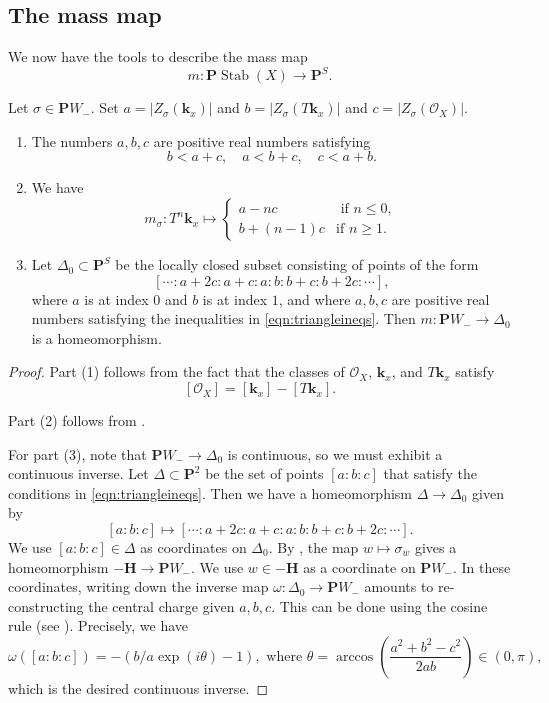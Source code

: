 \documentclass{amsart}
\begin{document}
\subsection{The mass map}
We now have the tools to describe the mass map
\[ m \colon \mathbf{P} \operatorname{Stab}(X) \to \mathbf{P}^S.\]
\begin{proposition}\label{prop:triangle0}
  Let \(\sigma \in \mathbf{P} W_{-}\).
  Set \(a = |Z_{\sigma}(\mathbf{k}_x)|\) and \(b = |Z_{\sigma}(T \mathbf{k}_{x})|\) and \(c = |Z_{\sigma}(\mathcal{O}_X)|\).
  \begin{enumerate}
  \item \label{eqn:triangleineqs}   The numbers \(a, b, c\) are positive real numbers satisfying
   \[
    b < a + c, \quad a < b+c, \quad c < a + b.
   \]
  \item We have
  \[ m_{\sigma} \colon T^n \mathbf{k}_x \mapsto
    \begin{cases}
      a - n c &\text{ if } n \leq 0,\\
      b + (n-1) c & \text{if } n \geq 1.
    \end{cases}
  \]
  \item Let \(\Delta_{0} \subset \mathbf{P}^S\) be the locally closed subset consisting of points of the form
   \[ [\cdots :a+2c:a+c:a:b:b+c:b+2c: \cdots],\]
   where \(a\) is at index 0 and \(b\) is at index \(1\), and where \(a,b,c\) are positive real numbers satisfying the inequalities in \eqref{eqn:triangleineqs}.
   Then \(m \colon \mathbf{P}W_{-} \to \Delta_{0}\) is a homeomorphism.
 \end{enumerate}
\end{proposition}
\begin{proof}
  Part (1) follows from the fact that the classes of \(\mathcal{O}_X\), \(\mathbf{k}_x\), and \(T \mathbf{k}_x\) satisfy
  \[ [\mathcal{O}_X] = [\mathbf{k}_x] - [T \mathbf{k}_x].\]

  Part (2) follows from .

  For part (3), note that \(\mathbf{P}W_- \to \Delta_0\) is continuous, so we must exhibit a continuous inverse.
  Let \(\Delta \subset \mathbf{P}^2\) be the set of points \([a:b:c]\) that satisfy the conditions in \eqref{eqn:triangleineqs}.
  Then we have a homeomorphism \(\Delta \to \Delta_0\) given by
  \[ [a:b:c] \mapsto [\cdots:a+2c:a+c:a:b:b+c:b+2c:\cdots].\]
  We use \([a:b:c] \in \Delta\) as coordinates on \(\Delta_0\).
  By , the map \(w \mapsto \sigma_w\) gives a homeomorphism \(-\mathbf{H} \to \mathbf{P} W_{-}\).
  We use \(w \in -\mathbf{H}\) as a coordinate on \(\mathbf{P} W_-\).
  In these coordinates, writing down the inverse map \(\omega \colon \Delta_{0} \to \mathbf{P}W_-\) amounts to re-constructing the central charge given \(a,b,c\).
  This can be done using the cosine rule (see ).
  Precisely, we have
  \begin{equation}\label{eqn:inv-}
    \omega([a:b:c]) = - (b/a \exp(i \theta) - 1), \text{ where } \theta = \arccos \left( \frac{a^2+b^2-c^2}{2ab} \right) \in (0,\pi),
  \end{equation}
  which is the desired continuous inverse.
  \end{proof}
\end{document}
